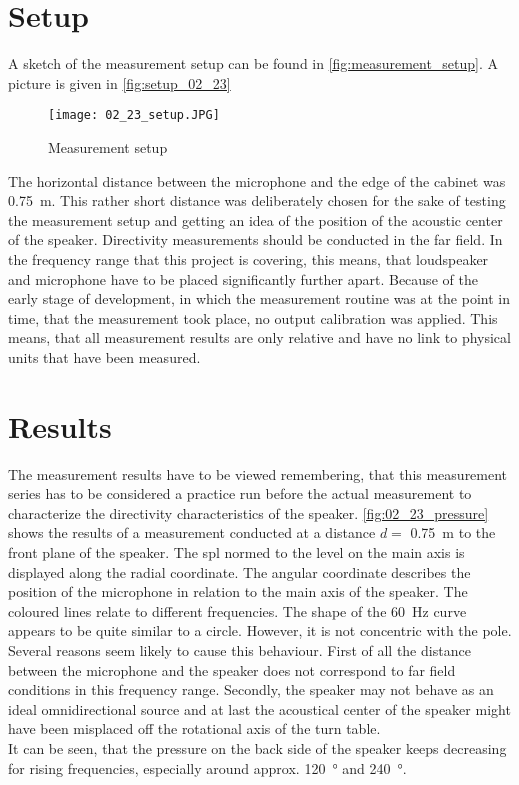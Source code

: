 \section*{Setup}
A sketch of the measurement setup can be found in \autoref{fig:measurement_setup}. A picture is given in \autoref{fig:setup_02_23}

\begin{figure}[htbp]
	\centering
	\texttt{[image: 02\_23\_setup.JPG]}
	\caption{Measurement setup}
		\label{fig:setup_02_23}
\end{figure}

The horizontal distance between the microphone and the edge of the cabinet was \SI{0.75}{\meter}. This rather short distance was deliberately chosen for the sake of testing the measurement setup and getting an idea of the position of the acoustic center of the speaker. Directivity measurements should be conducted in the far field. In the frequency range that this project is covering, this means, that loudspeaker and microphone have to be placed significantly further apart. Because of the early stage of development, in which the measurement routine was at the point in time, that the measurement took place, no output calibration was applied. This means, that all measurement results are only relative and have no link to physical units that have been measured.

\section*{Results}
The measurement results have to be viewed remembering, that this measurement series has to be considered a practice run before the actual measurement to characterize the directivity characteristics of the speaker. \autoref{fig:02_23_pressure} shows the results of a measurement conducted at a distance \(d=\) \SI{0.75}{\meter} to the front plane of the speaker. The \gls{spl} normed to the level on the main axis is displayed along the radial coordinate. The angular coordinate describes the position of the microphone in relation to the main axis of the speaker. The coloured lines relate to different frequencies.
The shape of the \SI{60}{\hertz} curve appears to be quite similar to a circle. However, it is not concentric with the pole. Several reasons seem likely to cause this behaviour.  First of all the distance between the microphone and the speaker does not correspond to far field conditions in this frequency range. Secondly, the speaker may not behave as an ideal omnidirectional source and at last the acoustical center of the speaker might have been misplaced off the rotational axis of the turn table.\\
It can be seen, that the pressure on the back side of the speaker keeps decreasing for rising frequencies, especially around approx. \SI{120}{\degree} and \SI{240}{\degree}.

